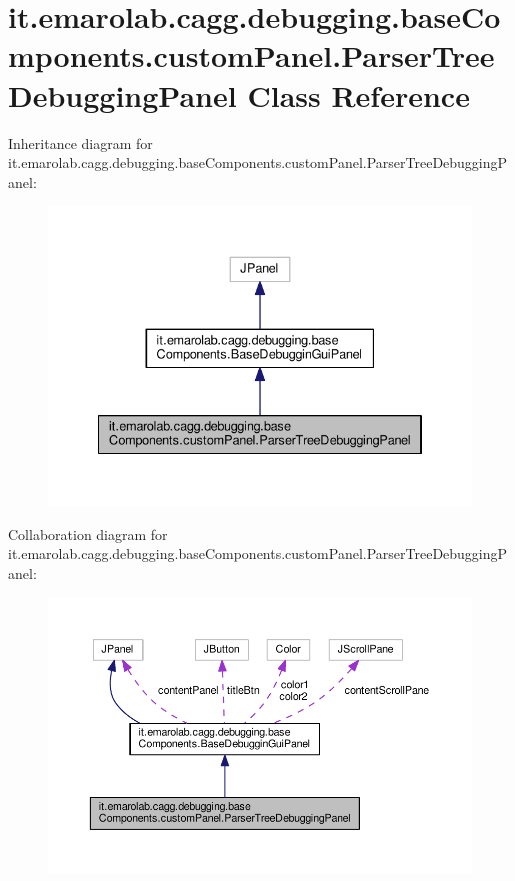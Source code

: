 \hypertarget{classit_1_1emarolab_1_1cagg_1_1debugging_1_1baseComponents_1_1customPanel_1_1ParserTreeDebuggingPanel}{\section{it.\-emarolab.\-cagg.\-debugging.\-base\-Components.\-custom\-Panel.\-Parser\-Tree\-Debugging\-Panel Class Reference}
\label{classit_1_1emarolab_1_1cagg_1_1debugging_1_1baseComponents_1_1customPanel_1_1ParserTreeDebuggingPanel}
}


Inheritance diagram for it.\-emarolab.\-cagg.\-debugging.\-base\-Components.\-custom\-Panel.\-Parser\-Tree\-Debugging\-Panel\-:\nopagebreak
\begin{figure}[H]
\begin{center}
\leavevmode
\includegraphics[width=334pt]{classit_1_1emarolab_1_1cagg_1_1debugging_1_1baseComponents_1_1customPanel_1_1ParserTreeDebuggingPanel__inherit__graph}
\end{center}
\end{figure}


Collaboration diagram for it.\-emarolab.\-cagg.\-debugging.\-base\-Components.\-custom\-Panel.\-Parser\-Tree\-Debugging\-Panel\-:\nopagebreak
\begin{figure}[H]
\begin{center}
\leavevmode
\includegraphics[width=350pt]{classit_1_1emarolab_1_1cagg_1_1debugging_1_1baseComponents_1_1customPanel_1_1ParserTreeDebuggingPanel__coll__graph}
\end{center}
\end{figure}
